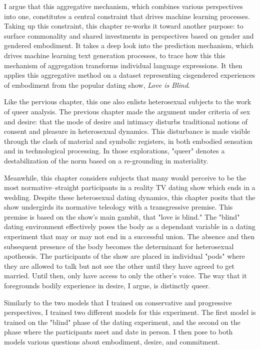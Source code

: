 \documentclass[11pt]{article}
\begin{document}
I argue that this aggregative mechanism, which combines various
perspectives into one, constitutes a central constraint that drives
machine learning processes. Taking up this constraint, this chapter
re-works it toward another purpose: to surface commonality and shared
investments in perspectives based on gender and gendered embodiment.
It takes a deep look into the prediction mechanism, which drives
machine learning text generation processes, to trace how this this
mechanism of aggregation transforms individual language expressions.
It then applies this aggregative method on a dataset representing
cisgendered experiences of embodiment from the popular dating show,
\emph{Love is Blind}.

Like the pervious chapter, this one also enlists heterosexual subjects
to the work of queer analysis. The previous chapter made the argument
under criteria of sex and desire: that the mode of desire and intimacy
disturbs traditional notions of consent and pleasure in heterosexual
dynamics. This disturbance is made visible through the clash of
material and symbolic registers, in both embodied sensation and in
technological processing. In those explorations, "queer" denotes a
destabilization of the norm based on a re-grounding in materiality.

Meanwhile, this chapter considers subjects that many would perceive to
be the most normative--straight participants in a reality TV dating
show which ends in a wedding. Despite these heterosexual dating
dynamics, this chapter posits that the show undergirds its normative
teleology with a transgressive premise. This premise is based on the
show's main gambit, that "love is blind." The "blind" dating
environment effectively poses the body as a dependant variable in a
dating experiment that may or may not end in a successful union. The
absence and then subsequent presence of the body becomes the
determinant for heterosexual apotheosis. The participants of the show
are placed in individual "pods" where they are allowed to talk but not
see the other until they have agreed to get married. Until then, only
have access to only the other's voice. The way that it foregrounds
bodily experience in desire, I argue, is distinctly queer.

Similarly to the two models that I trained on conservative and
progressive perspectives, I trained two different models for this
experiment. The first model is trained on the "blind" phase of the
dating experiment, and the second on the phase where the participants
meet and date in person. I then pose to both models various questions
about embodiment, desire, and commitment.
\end{document}
